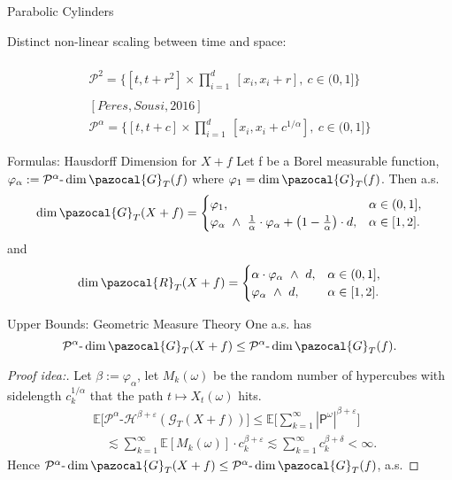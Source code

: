 \documentclass{beamer}
\theoremstyle{plain}
\theoremstyle{definition}
\theoremstyle{remark}
\newcommand{\1}{\mathbbm{1}}
\newcommand{\E}{{\mathbb E}}
\newcommand{\m}{\text{-}}
\newcommand{\eps}{\varepsilon}
\newcommand{\ph}{\varphi}
\begin{document}
\begin{frame}{Parabolic Cylinders}
\begin{center}
Distinct non-linear scaling between time and space:
\end{center}

\begin{gather*}
[Taylor, Watson, 1985]\\
\mathcal{P}^2=\bigg \{ [t,t+r^2]\times \prod_{i=1}^d\ [x_{i},x_{i}+r],\ c \in (0,1] \bigg\}\\
\quad \\
[Peres, Sousi, 2016]\\
\mathcal{P}^\alpha = \bigg \{ [t,t+c]\times \prod_{i=1}^d\ [x_{i},x_{i}+c^{1/\alpha}],\ c \in (0,1] \bigg\}
\end{gather*}

\end{frame}


\begin{frame}{Formulas: Hausdorff Dimension for $X+f$ }
Let f be a Borel measurable function, $\ph_\alpha := \mathcal{P}^\alpha\m\dim \pazocal{G}_T(f)$ where $\ph_1 = \dim \pazocal{G}_T(f)$.  Then a.s.
\begin{equation*}
\dim \pazocal{G}_T(X+f) =
\begin{cases}
\ph_1, & \alpha \in (0,1],\\
\ph_\alpha \ \wedge \ \frac{1}{\alpha} \cdot \ph_\alpha + \big(1-\frac{1}{\alpha}\big)\cdot d, & \alpha \in [1,2].
\end{cases}
\end{equation*}
and
\begin{equation*}
\dim \pazocal{R}_T(X+f) =
\begin{cases}
\alpha \cdot \ph_\alpha \ \wedge \ d, & \alpha \in (0,1],\\
\ph_\alpha \ \wedge \ d, & \alpha \in [1,2].
\end{cases}
\end{equation*}
\end{frame}

\begin{frame}{Upper Bounds: Geometric Measure Theory}
One a.s. has
\begin{equation*}
\mathcal{P}^\alpha\m\dim \pazocal{G}_T(X+f) \leq \mathcal{P}^\alpha\m\dim \pazocal{G}_T(f).
\end{equation*}
\begin{proof}[Proof idea:] Let $ \beta := \ph_\alpha$, let $M_k(\omega)$ be the random number of hypercubes with sidelength $c_k^{1/\alpha}$ that the path $t\mapsto X_t(\omega)$ hits. 
\begin{align*}
& \E\Big[\mathcal{P}^\alpha\m \mathcal{H}^{\beta+\eps}( \mathcal{G}_T(X+f))\Big]
\leq \E\Bigg[\sum_{k=1}^\infty |\mathsf{P}^\omega|^{\beta+\eps} \Bigg]\\
& \quad \lesssim \sum_{k=1}^\infty \E[M_k(\omega)]\cdot c_k^{\beta + \eps} \lesssim  \sum_{k=1}^\infty  c_k^{\beta + \delta} < \infty.
\end{align*}
Hence $\mathcal{P}^\alpha\m\dim \pazocal{G}_T(X+f) \leq \mathcal{P}^\alpha\m\dim \pazocal{G}_T(f)$, a.s.
\end{proof}
\end{frame}
\end{document}
